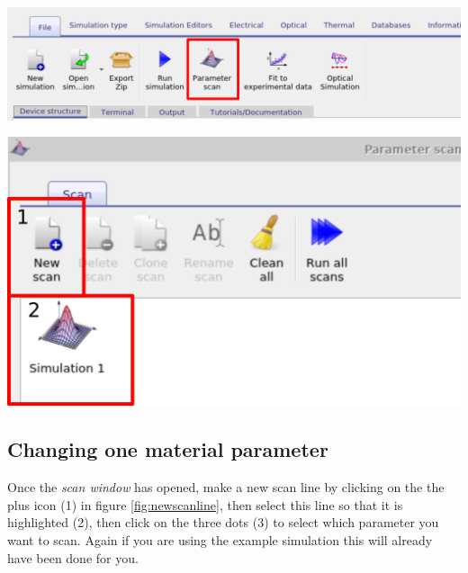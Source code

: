 \begin{minipage}[]{0.5\linewidth}
\centering
\includegraphics[width=\textwidth]{./images/param_scan.png}
\label{fig:parameter_scan_icon}

\centering
\includegraphics[width=\textwidth]{./images/param_scan_new.png}
\label{fig:newscan}

\end{minipage}

\subsection{Changing one material parameter}
Once the \emph{scan window} has opened, make a new scan line by clicking on the the plus icon (1) in figure \ref{fig:newscanline}, then select this line so that it is highlighted (2), then click on the three dots (3) to select which parameter you want to scan. Again if you are using the example simulation this will already have been done for you.

